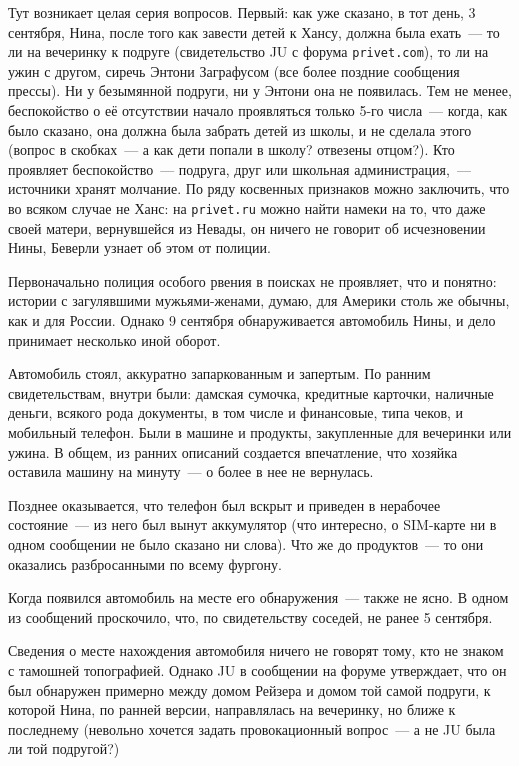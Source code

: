 Тут возникает целая серия вопросов. Первый: как уже сказано, в тот день, 3 сентября, Нина, после того как завести детей к Хансу, должна была ехать~--- то ли на вечеринку к подруге (свидетельство JU с форума \texttt{privet.com}), то ли на ужин с другом, сиречь Энтони Заграфусом (все более поздние сообщения прессы). Ни у безымянной подруги, ни у Энтони она не появилась. Тем не менее, беспокойство о её отсутствии начало проявляться только 5-го числа~--- когда, как было сказано, она должна была забрать детей из школы, и не сделала этого (вопрос в скобках~--- а как дети попали в школу? отвезены отцом?). Кто проявляет беспокойство~--- подруга, друг или школьная администрация,~--- источники хранят молчание. По ряду косвенных признаков можно заключить, что во всяком случае не Ханс: на \texttt{privet.ru} можно найти намеки на то, что даже своей матери, вернувшейся из Невады, он ничего не говорит об исчезновении Нины, Беверли узнает об этом от полиции. 

Первоначально полиция особого рвения в поисках не проявляет, что и понятно: истории с загулявшими мужьями-женами, думаю, для Америки столь же обычны, как и для России. Однако 9 сентября обнаруживается автомобиль Нины, и дело принимает несколько иной оборот. 

Автомобиль стоял, аккуратно запаркованным и запертым. По ранним свидетельствам, внутри были: дамская сумочка, кредитные карточки, наличные деньги, всякого рода документы, в том числе и финансовые, типа чеков, и мобильный телефон. Были в машине и продукты, закупленные для вечеринки или ужина. В общем, из ранних описаний создается впечатление, что хозяйка оставила машину на минуту~--- о более в нее не вернулась. 

Позднее оказывается, что телефон был вскрыт и приведен в нерабочее состояние~--- из него был вынут аккумулятор (что интересно, о SIM-карте ни в одном сообщении не было сказано ни слова). Что же до продуктов~--- то они оказались разбросанными по всему фургону. 

Когда появился автомобиль на месте его обнаружения~--- также не ясно. В одном из сообщений проскочило, что, по свидетельству соседей, не ранее 5 сентября. 

Сведения о месте нахождения автомобиля ничего не говорят тому, кто не знаком с тамошней топографией. Однако JU в сообщении на форуме утверждает, что он был обнаружен примерно между домом Рейзера и домом той самой подруги, к которой Нина, по ранней версии, направлялась на вечеринку, но ближе к последнему (невольно хочется задать провокационный вопрос~--- а не JU была ли той подругой?) 

